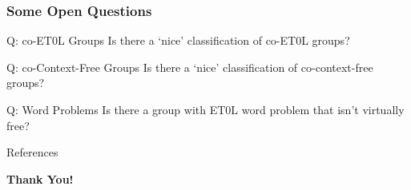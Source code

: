 \documentclass[11pt]{beamer}
\begin{document}

\begin{frame}
\frametitle{Some Open Questions}

\begin{block}{Q: co-ET0L Groups}
	Is there a `nice' classification of co-ET0L groups?
\end{block}

\vspace*{1em}

\begin{block}{Q: co-Context-Free Groups}
	Is there a `nice' classification of co-context-free groups?
\end{block}

\vspace*{1em}

\begin{block}{Q: Word Problems}
	Is there a group with ET0L word problem that isn't virtually free?
\end{block}

\end{frame}


\begin{frame}[allowframebreaks]{References}
\printbibliography[heading=none]
\end{frame}


\begin{frame}
\begin{center}
	\huge
	\vspace{2em}
	
	\bfseries
	Thank You!
\end{center}
\end{frame}
\end{document}
